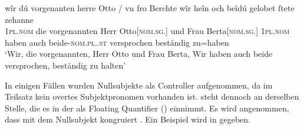 \begin{exe}
\ex \label{ex:cao_diffgend_11_beide}
		\gll wîr dú vorgenanten herre Otto / vn fro Berchte
				\textelp{} wîr heîn och beîdú \textelp{}
				gelobet ſtete zehanne \\
			\textsc{1pl\subMF.nom} die vorgenannten Herr
				Otto[\textsc{nom.sg.\MascM}] {} und Frau
				Berta[\textsc{nom.sg.\FemF}] {} \textsc{1pl\subMF.nom} haben
				auch beide-\textsc{nom.pl.\NeutMF.st} {} versprochen beständig
				zu=haben \\
		\trans `Wir, die vorgenannten, Herr Otto und Frau Berta,
		\textelp{} Wir haben auch beide \textelp{} versprochen, beständig zu
			halten'
			\parencites(Nr.~2931, Basel, 1298)[223,1--6]{cao4}

\end{exe}

\label{phsec:vbctrl}
In einigen Fällen wurden Nullsubjekte als Controller
aufgenommen, da im Teilsatz kein overtes Subjektpronomen vorhanden ist.
 steht dennoch an derselben Stelle, die es in der
 als Floating Quantifier
() einnimmt. Es wird angenommen, dass  mit
dem Nullsubjekt kongruiert \autocites[siehe
auch][419]{dalrymple2001}[210]{bresnanetal2016}. Ein Beispiel wird in
 gegeben.

